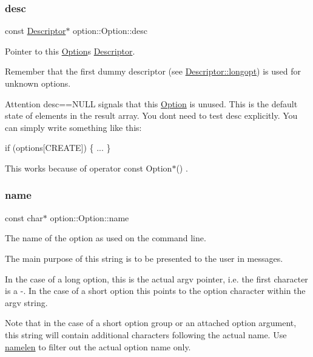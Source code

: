 \subsubsection{\texorpdfstring{desc}{desc}}
{\footnotesize\ttfamily const \hyperlink{structoption_1_1_descriptor}{Descriptor}$\ast$ option\+::\+Option\+::desc}



Pointer to this \hyperlink{classoption_1_1_option}{Option}\textquotesingle{}s \hyperlink{structoption_1_1_descriptor}{Descriptor}. 

Remember that the first dummy descriptor (see \hyperlink{structoption_1_1_descriptor_a470c449dfa894c9bfda2dae026142b4b}{Descriptor\+::longopt}) is used for unknown options.

\begin{DoxyAttention}{Attention}
{\ttfamily desc==N\+U\+LL} signals that this \hyperlink{classoption_1_1_option}{Option} is unused. This is the default state of elements in the result array. You don\textquotesingle{}t need to test {\ttfamily desc} explicitly. You can simply write something like this\+: 
\begin{DoxyCode}
\textcolor{keywordflow}{if} (options[CREATE])
\{
  ...
\}
\end{DoxyCode}
 This works because of {\ttfamily  operator const Option$\ast$() }. 
\end{DoxyAttention}
\mbox{\label{classoption_1_1_option_a02a76b4896abd22d0ba8514362261de9}} 
\subsubsection{\texorpdfstring{name}{name}}
{\footnotesize\ttfamily const char$\ast$ option\+::\+Option\+::name}



The name of the option as used on the command line. 

The main purpose of this string is to be presented to the user in messages.

In the case of a long option, this is the actual {\ttfamily argv} pointer, i.\+e. the first character is a \textquotesingle{}-\/\textquotesingle{}. In the case of a short option this points to the option character within the {\ttfamily argv} string.

Note that in the case of a short option group or an attached option argument, this string will contain additional characters following the actual name. Use \hyperlink{classoption_1_1_option_a3aa2957b19ad5815873441b415d56050}{namelen} to filter out the actual option name only. \mbox{\label{classoption_1_1_option_a3aa2957b19ad5815873441b415d56050}} 
